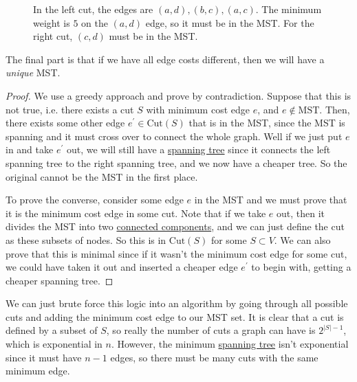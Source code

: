 \begin{theorem}
\begin{figure}[H]
\begin{subfigure}[b]{0.48\textwidth}
        \caption{}
      \end{subfigure}
      \label{fig:mst_cut_prop}
      \caption{In the left cut, the edges are $(a,d), (b, c), (a, c)$. The minimum weight is $5$ on the $(a, d)$ edge, so it must be in the MST. For the right cut, $(c, d)$ must be in the MST. }
    \end{figure}

    The final part is that if we have all edge costs different, then we will have a \textit{unique} MST. 
  \end{theorem}
  \begin{proof}
    We use a greedy approach and prove by contradiction. Suppose that this is not true, i.e. there exists a cut $S$ with minimum cost edge $e$, and $e \not\in \mathrm{MST}$. Then, there exists some other edge $e^\prime \in \mathrm{Cut}(S)$ that is in the MST, since the MST is spanning and it must cross over to connect the whole graph. Well if we just put $e$ in and take $e^\prime$ out, we will still have a \hyperref[def:spanning-tree]{spanning tree} since it connects the left spanning tree to the right spanning tree, and we now have a cheaper tree. So the original cannot be the MST in the first place. 

    To prove the converse, consider some edge $e$ in the MST and we must prove that it is the minimum cost edge in some cut. Note that if we take $e$ out, then it divides the MST into two \hyperref[pst-def:connected-components]{connected components}, and we can just define the cut as these subsets of nodes. So this is in $\mathrm{Cut}(S)$ for some $S \subset V$. We can also prove that this is minimal since if it wasn't the minimum cost edge for some cut, we could have taken it out and inserted a cheaper edge $e^\prime$ to begin with, getting a cheaper spanning tree.   
  \end{proof}

  We can just brute force this logic into an algorithm by going through all possible cuts and adding the minimum cost edge to our MST set. It is clear that a cut is defined by a subset of $S$, so really the number of cuts a graph can have is $2^{|S| - 1}$, which is exponential in $n$. However, the minimum \hyperref[def:spanning-tree]{spanning tree} isn't exponential since it must have $n-1$ edges, so there must be many cuts with the same minimum edge. 

